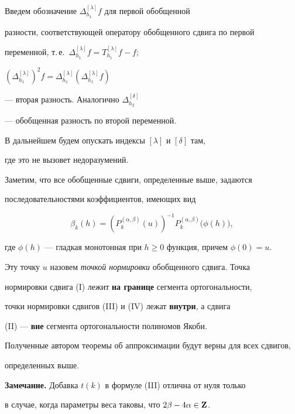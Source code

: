 \medskip





Введем обозначение $\Delta_{h_1}^{[\lambda]}f$ для первой обобщенной 


разности, соответствующей оператору обобщенного сдвига по первой 


переменной, т.\,е.~$\Delta_{h_1}^{[\lambda]}f=T_{h_1}^{[\lambda]}f-f$;


$(\Delta_{h_1}^{[\lambda]})^2f=


\Delta_{h_1}^{[\lambda]}(\Delta_{h_1}^{[\lambda]}f)$


--- вторая разность. Аналогично $\Delta_{h_2}^{[\delta ]}$


--- обобщенная разность по второй переменной.


В дальнейшем будем опускать индексы $[\lambda]$ и $[\delta]$ там,


где это не вызовет недоразумений.





Заметим, что все обобщенные сдвиги, определенные выше, задаются 


последовательностями коэффициентов, имеющих вид


$$


\beta_k(h)=(P_k^{(\alpha,\beta)}(u))^{-1}P_k^{(\alpha,\beta)}


\big(\phi (h)\big),


$$


где $\phi(h)$ --- гладкая монотонная при $h\ge0$ функция, причем $\phi(0)=u$.


Эту точку $u$ назовем {\it точкой нормировки} обобщенного сдвига. Точка 


нормировки сдвига (I) лежит {\bf на границе} сегмента ортогональности,


точки нормировки сдвигов (III) и (IV) лежат {\bf внутри}, а сдвига


(II) --- {\bf вне} сегмента ортогональности полиномов Якоби.


Полученные автором теоремы об аппроксимации будут верны для всех сдвигов,


определенных выше.


\medskip





{\bf Замечание.} Добавка $t(k)$ в формуле (III) отлична от нуля только 


в случае, когда параметры веса таковы, что $2\beta-4\alpha\in {\bold Z}$.


